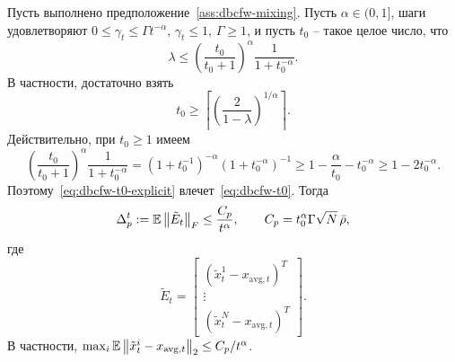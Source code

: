 \begin{lemma}
\label{lem:dbcfw-consensus}
Пусть выполнено предположение~\ref{ass:dbcfw-mixing}.
Пусть $\alpha\in(0,1]$, шаги удовлетворяют
$0\leq\gamma_t\leq \Gamma t^{-\alpha}$, $\gamma_t\leq1$,
$\Gamma\geq 1$, и пусть $t_0$ -- такое целое число, что
\begin{equation}
\label{eq:dbcfw-t0}
    \lambda
    \leq
    \left(\frac{t_0}{t_0+1}\right)^\alpha
    \frac{1}{1+t_0^{-\alpha}}.
\end{equation}
В частности, достаточно взять
\begin{equation}
\label{eq:dbcfw-t0-explicit}
    t_0
    \geq
    \left\lceil
        \left(\frac{2}{1-\lambda}\right)^{1/\alpha}
    \right\rceil .
\end{equation}
Действительно, при $t_0\geq1$ имеем
\[
    \left(\frac{t_0}{t_0+1}\right)^\alpha
    \frac{1}{1+t_0^{-\alpha}}
    =
    (1+t_0^{-1})^{-\alpha}(1+t_0^{-\alpha})^{-1}
    \geq
    1-\frac{\alpha}{t_0}-t_0^{-\alpha}
    \geq
    1-2t_0^{-\alpha}.
\]
Поэтому~\eqref{eq:dbcfw-t0-explicit} влечет~\eqref{eq:dbcfw-t0}.
Тогда
\begin{equation}
\label{eq:dbcfw-consensus-bound}
    \Delta_p^t
    :=
    \mathbb{E}\left\|\tilde E_t\right\|_F
    \leq
    \frac{C_p}{t^\alpha},
    \qquad
    C_p=t_0^\alpha\Gamma\sqrt N\,\bar\rho ,
\end{equation}
где
\[
    \tilde E_t=
    \begin{bmatrix}
        (\tilde x_t^1-x_{\mathrm{avg},t})^T\\
        \vdots\\
        (\tilde x_t^N-x_{\mathrm{avg},t})^T
    \end{bmatrix}.
\]
В частности,
$\max_i\mathbb{E}\left\|\tilde x_t^i-x_{\mathrm{avg},t}\right\|_2\leq C_p/t^\alpha$.
\end{lemma}


